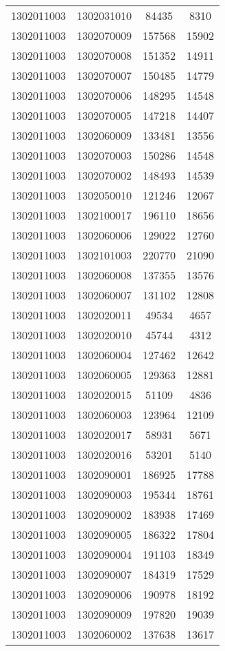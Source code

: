 \begin{longtable}{llcc}
1302011003 & 1302031010 & 84435 & 8310\\
1302011003 & 1302070009 & 157568 & 15902\\
1302011003 & 1302070008 & 151352 & 14911\\
1302011003 & 1302070007 & 150485 & 14779\\
1302011003 & 1302070006 & 148295 & 14548\\
1302011003 & 1302070005 & 147218 & 14407\\
1302011003 & 1302060009 & 133481 & 13556\\
1302011003 & 1302070003 & 150286 & 14548\\
1302011003 & 1302070002 & 148493 & 14539\\
1302011003 & 1302050010 & 121246 & 12067\\
1302011003 & 1302100017 & 196110 & 18656\\
1302011003 & 1302060006 & 129022 & 12760\\
1302011003 & 1302101003 & 220770 & 21090\\
1302011003 & 1302060008 & 137355 & 13576\\
1302011003 & 1302060007 & 131102 & 12808\\
1302011003 & 1302020011 & 49534 & 4657\\
1302011003 & 1302020010 & 45744 & 4312\\
1302011003 & 1302060004 & 127462 & 12642\\
1302011003 & 1302060005 & 129363 & 12881\\
1302011003 & 1302020015 & 51109 & 4836\\
1302011003 & 1302060003 & 123964 & 12109\\
1302011003 & 1302020017 & 58931 & 5671\\
1302011003 & 1302020016 & 53201 & 5140\\
1302011003 & 1302090001 & 186925 & 17788\\
1302011003 & 1302090003 & 195344 & 18761\\
1302011003 & 1302090002 & 183938 & 17469\\
1302011003 & 1302090005 & 186322 & 17804\\
1302011003 & 1302090004 & 191103 & 18349\\
1302011003 & 1302090007 & 184319 & 17529\\
1302011003 & 1302090006 & 190978 & 18192\\
1302011003 & 1302090009 & 197820 & 19039\\
1302011003 & 1302060002 & 137638 & 13617\\

\end{longtable}
